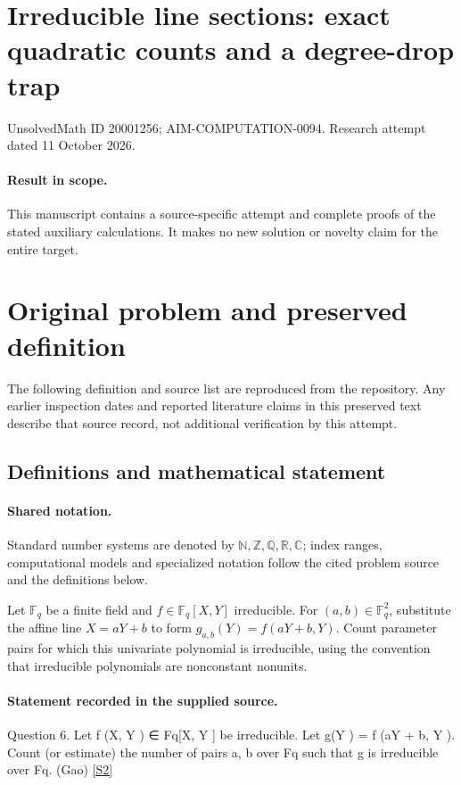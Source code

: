 \documentclass[11pt]{article}
\begin{document}
\section*{Irreducible line sections: exact quadratic counts and a degree-drop trap}
\noindent UnsolvedMath ID 20001256; AIM-COMPUTATION-0094. Research attempt dated 11 October 2026.
\paragraph{Result in scope.}This manuscript contains a source-specific attempt and complete proofs of the stated auxiliary calculations. It makes no new solution or novelty claim for the entire target.
\section{Original problem and preserved definition}
The following definition and source list are reproduced from the repository. Any earlier inspection dates and reported literature claims in this preserved text describe that source record, not additional verification by this attempt.
\subsection{Definitions and mathematical statement}

\paragraph{Shared notation.}Standard number systems are denoted by $\mathbb N,\mathbb Z,\mathbb Q,\mathbb R,\mathbb C$; index ranges, computational models and specialized notation follow the cited problem source and the definitions below.


Let $\mathbb F_q$ be a finite field and $f\in\mathbb F_q[X,Y]$ irreducible. For $(a,b)\in\mathbb F_q^2$, substitute the affine line $X=aY+b$ to form $g_{a,b}(Y)=f(aY+b,Y)$. Count parameter pairs for which this univariate polynomial is irreducible, using the convention that irreducible polynomials are nonconstant nonunits.
\paragraph{Statement recorded in the supplied source.}
Question 6. Let f (X, Y ) ∈ Fq[X, Y ] be irreducible. Let g(Y ) = f (aY + b, Y ). Count (or estimate) the number of pairs a, b over Fq such that g is irreducible over Fq. (Gao) \href{https://aimath.org/WWN/primesinp/primesinp.pdf}{[S2]}
\end{document}
